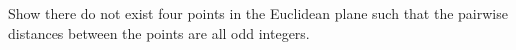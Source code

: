 Show there do not exist four points in the Euclidean plane such that the
pairwise distances between the points are all odd integers.
